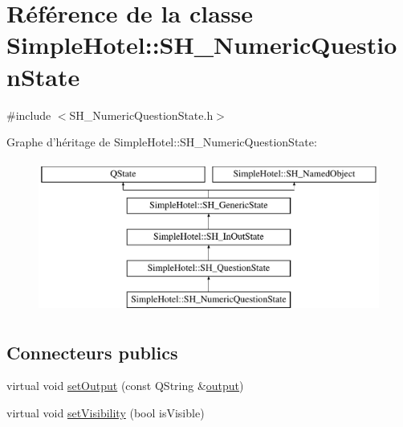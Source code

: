 \hypertarget{classSimpleHotel_1_1SH__NumericQuestionState}{\section{Référence de la classe Simple\-Hotel\-:\-:S\-H\-\_\-\-Numeric\-Question\-State}
\label{classSimpleHotel_1_1SH__NumericQuestionState}
}


{\ttfamily \#include $<$S\-H\-\_\-\-Numeric\-Question\-State.\-h$>$}

Graphe d'héritage de Simple\-Hotel\-:\-:S\-H\-\_\-\-Numeric\-Question\-State\-:\begin{figure}[H]
\begin{center}
\leavevmode
\includegraphics[height=5.000000cm]{classSimpleHotel_1_1SH__NumericQuestionState}
\end{center}
\end{figure}
\subsection*{Connecteurs publics}
\begin{DoxyCompactItemize}
\item 
virtual void \hyperlink{classSimpleHotel_1_1SH__InOutState_a5e151d7b01cceb6766b6d83d4a9ac1aa}{set\-Output} (const Q\-String \&\hyperlink{classSimpleHotel_1_1SH__InOutState_a71b15e4d49b9c2aa540500065ceb39da}{output})
\item 
virtual void \hyperlink{classSimpleHotel_1_1SH__InOutState_a2da1edbe247e9b2661c81c9dc2c7ef8d}{set\-Visibility} (bool is\-Visible)
\end{DoxyCompactItemize}
